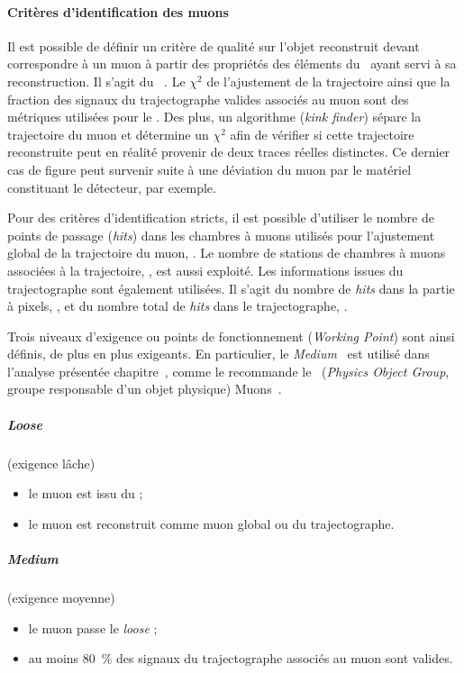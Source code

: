 \paragraph{Critères d'identification des muons}
Il est possible de définir un critère de qualité sur l'objet reconstruit devant correspondre à un muon à partir des propriétés des éléments du \PF\ ayant servi à sa reconstruction.
Il s'agit du \muonID~\cite{CMS-MUO-16-001,cmsMediumMuon}.
Le $\chi^2$ de l'ajustement de la trajectoire ainsi que la fraction des signaux du trajectographe valides associés au muon sont des métriques utilisées pour le \muonID.
Des plus, un algorithme (\emph{kink finder}) sépare la trajectoire du muon et détermine un $\chi^2$ afin de vérifier si cette trajectoire reconstruite peut en réalité provenir de deux traces réelles distinctes.
Ce dernier cas de figure peut survenir suite à une déviation du muon par le matériel constituant le détecteur, par exemple.
\par
Pour des critères d'identification stricts, il est possible d'utiliser le nombre de points de passage (\emph{hits}) dans les chambres à muons utilisés pour l'ajustement global de la trajectoire du muon, \Nmdhits.
Le nombre de stations de chambres à muons associées à la trajectoire, \Nms, est aussi exploité.
Les informations issues du trajectographe sont également utilisées.
Il s'agit du nombre de \emph{hits} dans la partie à pixels, \Npixelhits, et du nombre total de \emph{hits} dans le trajectographe, \Ntrkhits.
\par
Trois niveaux d'exigence ou points de fonctionnement (\emph{Working Point}) sont ainsi définis, de plus en plus exigeants.
En particulier, le \emph{Medium} \muonID\ est utilisé dans l'analyse présentée chapitre~, comme le recommande le \POG\ (\emph{Physics Object Group}, groupe responsable d'un objet physique) Muons~\cite{cmsMediumMuon}.
\subparagraph{\emph{Loose} \muonID} (exigence lâche)
\begin{itemize}
\item le muon est issu du \PF;
\item le muon est reconstruit comme muon global ou du trajectographe.
\end{itemize}
\subparagraph{\emph{Medium} \muonID} (exigence moyenne)
\begin{itemize}
\item le muon passe le \emph{loose} \muonID;
\item au moins \SI{80}{\%} des signaux du trajectographe associés au muon sont valides.
\end{itemize}
